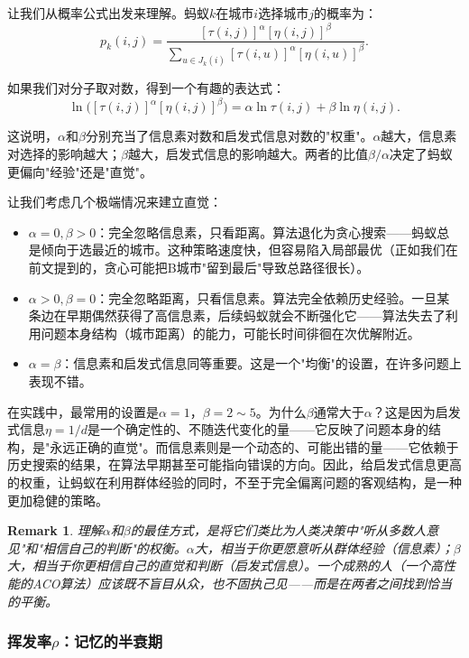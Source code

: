 \documentclass[lang=cn,zihao=-4,a4paper,fontset=windows]{beautybook}
\newtheorem*{remark}{\textbf{Remark}}
\begin{document}
让我们从概率公式出发来理解。蚂蚁$k$在城市$i$选择城市$j$的概率为：
\[
p_k(i,j) = \frac{[\tau(i,j)]^\alpha [\eta(i,j)]^\beta}{\sum_{u \in J_k(i)} [\tau(i,u)]^\alpha [\eta(i,u)]^\beta}.
\]

如果我们对分子取对数，得到一个有趣的表达式：
\[
\ln\big([\tau(i,j)]^\alpha [\eta(i,j)]^\beta\big) = \alpha \ln\tau(i,j) + \beta \ln\eta(i,j).
\]

这说明，$\alpha$和$\beta$分别充当了信息素对数和启发式信息对数的"权重"。$\alpha$越大，信息素对选择的影响越大；$\beta$越大，启发式信息的影响越大。两者的比值$\beta/\alpha$决定了蚂蚁更偏向"经验"还是"直觉"。

让我们考虑几个极端情况来建立直觉：
\begin{itemize}
    \item \textbf{$\alpha = 0, \beta > 0$}：完全忽略信息素，只看距离。算法退化为贪心搜索——蚂蚁总是倾向于选最近的城市。这种策略速度快，但容易陷入局部最优（正如我们在前文提到的，贪心可能把B城市"留到最后"导致总路径很长）。
    \item \textbf{$\alpha > 0, \beta = 0$}：完全忽略距离，只看信息素。算法完全依赖历史经验。一旦某条边在早期偶然获得了高信息素，后续蚂蚁就会不断强化它——算法失去了利用问题本身结构（城市距离）的能力，可能长时间徘徊在次优解附近。
    \item \textbf{$\alpha = \beta$}：信息素和启发式信息同等重要。这是一个"均衡"的设置，在许多问题上表现不错。
\end{itemize}

在实践中，最常用的设置是$\alpha = 1$，$\beta = 2 \sim 5$。为什么$\beta$通常大于$\alpha$？这是因为启发式信息$\eta = 1/d$是一个确定性的、不随迭代变化的量——它反映了问题本身的结构，是"永远正确的直觉"。而信息素则是一个动态的、可能出错的量——它依赖于历史搜索的结果，在算法早期甚至可能指向错误的方向。因此，给启发式信息更高的权重，让蚂蚁在利用群体经验的同时，不至于完全偏离问题的客观结构，是一种更加稳健的策略。

\begin{remark}
理解$\alpha$和$\beta$的最佳方式，是将它们类比为人类决策中"听从多数人意见"和"相信自己的判断"的权衡。$\alpha$大，相当于你更愿意听从群体经验（信息素）；$\beta$大，相当于你更相信自己的直觉和判断（启发式信息）。一个成熟的人（一个高性能的ACO算法）应该既不盲目从众，也不固执己见——而是在两者之间找到恰当的平衡。
\end{remark}

\subsubsection{挥发率$\rho$：记忆的半衰期}
\end{document}
